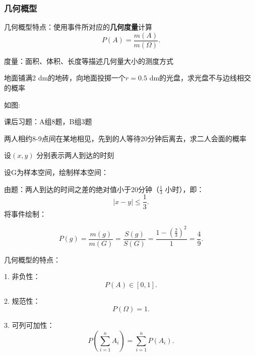 \subsubsection{几何概型}%
\label{subsub:几何概型}
几何概型特点：使用事件所对应的\textbf{几何度量}计算
\[
    P\left( A \right) =\frac{m\left( A \right) }{m\left( \Omega \right) }
.\] 
\begin{notation}
    度量：面积、体积、长度等描述几何量大小的测度方式
\end{notation}
\begin{eg}
    地面铺满2 dm的地砖，向地面投掷一个$r=0.5$ dm的光盘，求光盘不与边线相交的概率
\end{eg}
如图:
\begin{center}
\end{center}
课后习题：A组8题，B组3题
\begin{eg}
    两人相约8-9点间在某地相见，先到的人等待20分钟后离去，求二人会面的概率

    设$\left( x,y \right) $ 分别表示两人到达的时刻

    设G为样本空间，绘制样本空间：
    \begin{center}
    \end{center}

    由题：两人到达的时间之差的绝对值小于20分钟（$\frac{1}{3}$ 小时），即：\[
        |x-y|\le \frac{1}{3}
    .\] 
    将事件绘制：
    \begin{center}
    \end{center}
    \[
        P\left( g \right) =\frac{m\left( g \right) }{m\left( G \right) }=\frac{S\left( g \right) }{S\left( G \right) }=\frac{1-\left( \frac{2}{3} \right) ^2}{1}=\frac{4}{9}
    .\] 
\end{eg}
\begin{notation}
    几何概型的特点：

    1. 非负性：\[
        P\left( A \right) \in \left[ 0,1 \right] 
    .\] 

    2. 规范性：\[
        P\left( \Omega \right) =1
    .\] 

    3. 可列可加性： \[
        P\left( \sum_{i=1}^{n} A_i \right) =\sum_{i=1}^{n} P\left( A_i \right) 
    .\] 
\end{notation}
